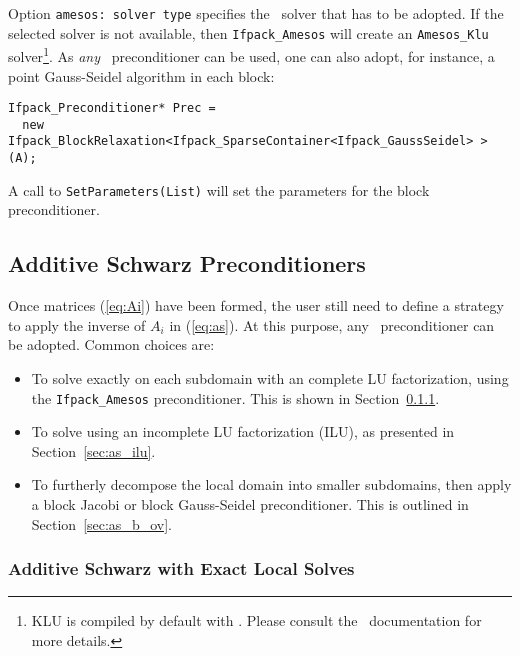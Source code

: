 Option \verb!amesos: solver type! specifies the \amesos\ solver that
has to be adopted. If the selected solver is not available, then
\verb!Ifpack_Amesos! will create an \verb!Amesos_Klu! solver\footnote{KLU is
  compiled by default with \amesos. Please consult the \amesos\ documentation
    for more details.}.
As {\sl any} \ifpack\ preconditioner can be used, one can also adopt, for
instance, a point Gauss-Seidel algorithm in each block:
\begin{verbatim}
Ifpack_Preconditioner* Prec =
  new Ifpack_BlockRelaxation<Ifpack_SparseContainer<Ifpack_GaussSeidel> >(A);
\end{verbatim}

A call to \verb!SetParameters(List)! will set the parameters for the block
preconditioner.

\subsection{Additive Schwarz Preconditioners}
\label{sec:as}

Once matrices (\ref{eq:Ai}) have been formed, the user still need to define a
strategy to apply the inverse of $A_i$ in (\ref{eq:as}). At this purpose,
any \ifpack\ preconditioner can be adopted. Common choices are:
\begin{itemize}
\item To solve exactly on each subdomain with an complete LU factorization, using the \verb!Ifpack_Amesos!
preconditioner. This is shown in Section~\ref{sec:as_amesos}.
\item To solve using an incomplete LU factorization (ILU), as presented in
Section~\ref{sec:as_ilu}.
\item To furtherly decompose the local domain into smaller subdomains,
  then apply a block Jacobi or block Gauss-Seidel preconditioner. This is
  outlined in Section~\ref{sec:as_b_ov}.
\end{itemize}

\subsubsection{Additive Schwarz with Exact Local Solves}
\label{sec:as_amesos}

